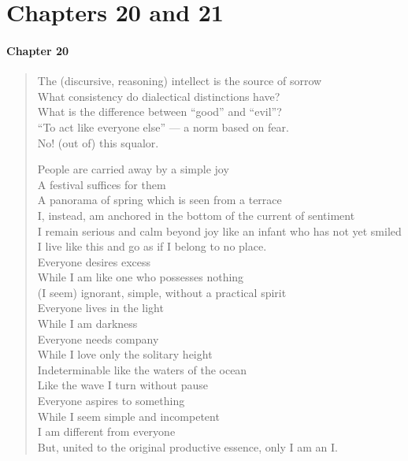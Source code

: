 \section{Chapters 20 and 21}

\label{sec:PrincipleAction2021}

\paragraph{Chapter 20}

\begin{verse}
The (discursive, reasoning) intellect is the source of sorrow\\ What consistency do dialectical distinctions have?\\ What is the difference between ``good'' and ``evil''?\\ ``To act like everyone else'' --- a norm based on fear.\\ No! (out of) this squalor.

People are carried away by a simple joy\\ A festival suffices for them\\ A panorama of spring which is seen from a terrace\\ I, instead, am anchored in the bottom of the current of sentiment\\ I remain serious and calm beyond joy like an infant who has not yet smiled\\ I live like this and go as if I belong to no place.\\ Everyone desires excess\\ While I am like one who possesses nothing\\ (I seem) ignorant, simple, without a practical spirit\\ Everyone lives in the light\\ While I am darkness\\ Everyone needs company\\ While I love only the solitary height\\ Indeterminable like the waters of the ocean\\ Like the wave I turn without pause\\ Everyone aspires to something\\ While I seem simple and incompetent\\ I am different from everyone\\ But, united to the original productive essence, only I am an I.
\end{verse}

